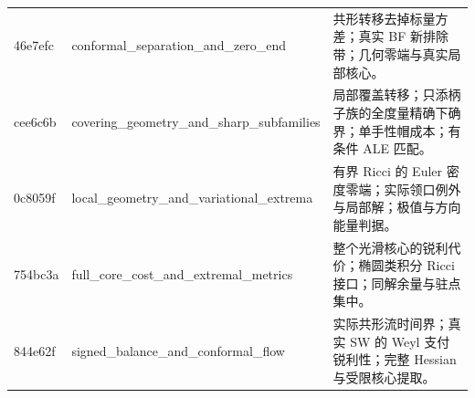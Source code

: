 \documentclass[
  10pt,
]{article}
\begin{document}
\begin{longtable}[]{@{}lll@{}}
\begin{minipage}[t]{0.30\columnwidth}
46e7efc\strut
\end{minipage} & \begin{minipage}[t]{0.30\columnwidth}\raggedright
conformal\_separation\_and\_zero\_end\strut
\end{minipage} & \begin{minipage}[t]{0.30\columnwidth}\raggedright
共形转移去掉标量方差；真实 BF 新排除带；几何零端与真实局部核心。\strut
\end{minipage}\tabularnewline
\begin{minipage}[t]{0.30\columnwidth}\raggedright
cee6c6b\strut
\end{minipage} & \begin{minipage}[t]{0.30\columnwidth}\raggedright
covering\_geometry\_and\_sharp\_subfamilies\strut
\end{minipage} & \begin{minipage}[t]{0.30\columnwidth}\raggedright
局部覆盖转移；只添柄子族的全度量精确下确界；单手性帽成本；有条件 ALE
匹配。\strut
\end{minipage}\tabularnewline
\begin{minipage}[t]{0.30\columnwidth}\raggedright
0c8059f\strut
\end{minipage} & \begin{minipage}[t]{0.30\columnwidth}\raggedright
local\_geometry\_and\_variational\_extrema\strut
\end{minipage} & \begin{minipage}[t]{0.30\columnwidth}\raggedright
有界 Ricci 的 Euler
密度零端；实际领口例外与局部解；极值与方向能量判据。\strut
\end{minipage}\tabularnewline
\begin{minipage}[t]{0.30\columnwidth}\raggedright
754bc3a\strut
\end{minipage} & \begin{minipage}[t]{0.30\columnwidth}\raggedright
full\_core\_cost\_and\_extremal\_metrics\strut
\end{minipage} & \begin{minipage}[t]{0.30\columnwidth}\raggedright
整个光滑核心的锐利代价；椭圆类积分 Ricci
接口；同解余量与驻点集中。\strut
\end{minipage}\tabularnewline
\begin{minipage}[t]{0.30\columnwidth}\raggedright
844e62f\strut
\end{minipage} & \begin{minipage}[t]{0.30\columnwidth}\raggedright
signed\_balance\_and\_conformal\_flow\strut
\end{minipage} & \begin{minipage}[t]{0.30\columnwidth}\raggedright
实际共形流时间界；真实 SW 的 Weyl 支付锐利性；完整 Hessian
与受限核心提取。\strut
\end{minipage}\tabularnewline
\bottomrule
\end{longtable}
\end{document}
